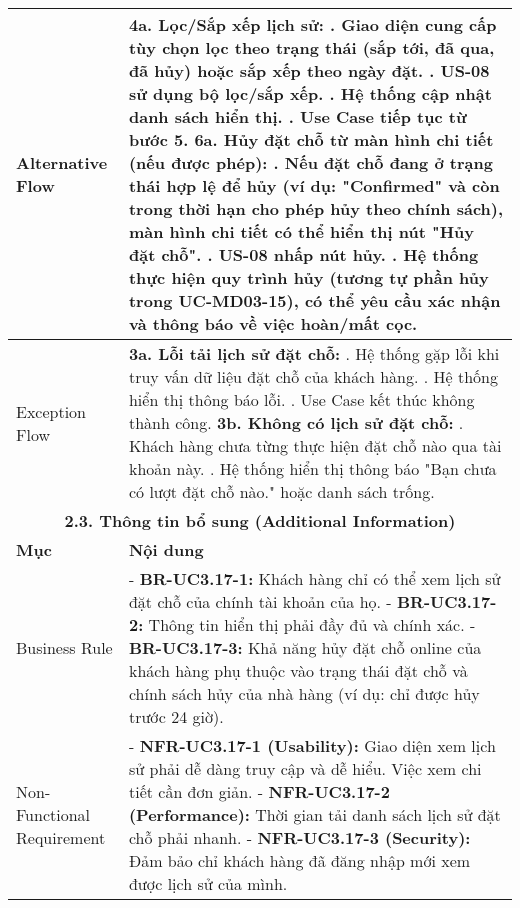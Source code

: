\begin{longtable}{|m{4cm}|p{11cm}|}
\hline
Alternative Flow & \textbf{4a. Lọc/Sắp xếp lịch sử:} \newline    1. Giao diện cung cấp tùy chọn lọc theo trạng thái (sắp tới, đã qua, đã hủy) hoặc sắp xếp theo ngày đặt. \newline    2. US-08 sử dụng bộ lọc/sắp xếp. \newline    3. Hệ thống cập nhật danh sách hiển thị. \newline    4. Use Case tiếp tục từ bước 5. \newline \textbf{6a. Hủy đặt chỗ từ màn hình chi tiết (nếu được phép):} \newline    1. Nếu đặt chỗ đang ở trạng thái hợp lệ để hủy (ví dụ: "Confirmed" và còn trong thời hạn cho phép hủy theo chính sách), màn hình chi tiết có thể hiển thị nút "Hủy đặt chỗ". \newline    2. US-08 nhấp nút hủy. \newline    3. Hệ thống thực hiện quy trình hủy (tương tự phần hủy trong UC-MD03-15), có thể yêu cầu xác nhận và thông báo về việc hoàn/mất cọc. \\
\hline
Exception Flow & \textbf{3a. Lỗi tải lịch sử đặt chỗ:} \newline    1. Hệ thống gặp lỗi khi truy vấn dữ liệu đặt chỗ của khách hàng. \newline    2. Hệ thống hiển thị thông báo lỗi. \newline    3. Use Case kết thúc không thành công. \newline \textbf{3b. Không có lịch sử đặt chỗ:} \newline    1. Khách hàng chưa từng thực hiện đặt chỗ nào qua tài khoản này. \newline    2. Hệ thống hiển thị thông báo "Bạn chưa có lượt đặt chỗ nào." hoặc danh sách trống. \\
\hline
\multicolumn{2}{|c|}{\textbf{2.3. Thông tin bổ sung (Additional Information)}} \\
\hline
\textbf{Mục} & \textbf{Nội dung} \\
\hline
Business Rule & - \textbf{BR-UC3.17-1:} Khách hàng chỉ có thể xem lịch sử đặt chỗ của chính tài khoản của họ. \newline - \textbf{BR-UC3.17-2:} Thông tin hiển thị phải đầy đủ và chính xác. \newline - \textbf{BR-UC3.17-3:} Khả năng hủy đặt chỗ online của khách hàng phụ thuộc vào trạng thái đặt chỗ và chính sách hủy của nhà hàng (ví dụ: chỉ được hủy trước 24 giờ). \\
\hline
Non-Functional Requirement & - \textbf{NFR-UC3.17-1 (Usability):} Giao diện xem lịch sử phải dễ dàng truy cập và dễ hiểu. Việc xem chi tiết cần đơn giản. \newline - \textbf{NFR-UC3.17-2 (Performance):} Thời gian tải danh sách lịch sử đặt chỗ phải nhanh. \newline - \textbf{NFR-UC3.17-3 (Security):} Đảm bảo chỉ khách hàng đã đăng nhập mới xem được lịch sử của mình. \\
\hline
\end{longtable}




